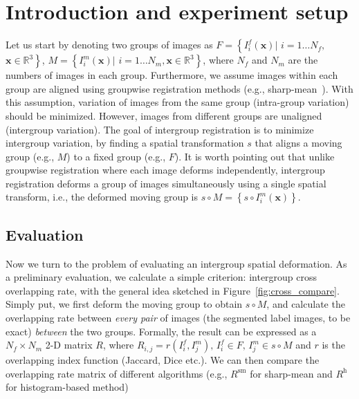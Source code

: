 \documentclass[preprint,review,12pt]{elsarticle}
\newcommand{\ie}{{i.e., }}
\newcommand{\eg}{{e.g., }}
\newcommand{\MovingGroup}{M}
\newcommand{\FixedGroup}{F}
\newcommand{\bfx}{\mathbf{x}}						%
\begin{document}
\section{Introduction and experiment setup}
\label{sec:introduction}
Let us start by denoting two groups of images as  $\FixedGroup=\left\{I^f_i(\bfx) |\,\, i=1\ldots N_f,  \right.$  $ \left.  \bfx\in \mathbb{R}^3\right\}$, $\MovingGroup=\left\{I^m_i(\bfx) |\,\, i=1\ldots N_m, \bfx\in \mathbb{R}^3\right\}$, where $N_f$ and $N_m$ are the numbers of images in each group. Furthermore, we assume images within each group are aligned using groupwise registration methods (\eg sharp-mean~\cite{Wu20111968}). With this assumption, variation of images from the same group (intra-group variation) should be minimized. However, images from different groups are unaligned (intergroup variation). The goal of intergroup registration is to minimize intergroup variation, by finding a spatial transformation $s$ that aligns a moving group (\eg $\MovingGroup$) to a fixed group (\eg $\FixedGroup$). It is worth pointing out that unlike groupwise registration where each image deforms independently, intergroup registration deforms a group of images simultaneously using a single spatial transform, \ie the deformed moving group is $s\circ \MovingGroup = \left\{s\circ I^m_i(\bfx) \right\}$.

\subsection{Evaluation}
Now we turn to the problem of evaluating an intergroup spatial deformation. As a preliminary evaluation, we calculate a simple criterion: intergroup cross overlapping rate, with the general idea sketched in Figure~\ref{fig:cross_compare}. Simply put, we first deform the moving group to obtain $s\circ \MovingGroup$, and calculate the overlapping rate between \emph{every pair} of images (the segmented label images, to be exact) \emph{between} the two groups. Formally, the result can be expressed as a $N_f \times N_m$ 2-D matrix $R$, where $R_{i,j}=r(I^f_i,I^m_j),\, I^f_i \in \FixedGroup,\, I^m_j \in s\circ \MovingGroup$  and $r$ is the overlapping index function (Jaccard, Dice etc.). We can then compare the overlapping rate matrix of different algorithms (\eg $R^{\text{sm}}$ for sharp-mean and $R^{\text{h}}$ for histogram-based method)
\end{document}
